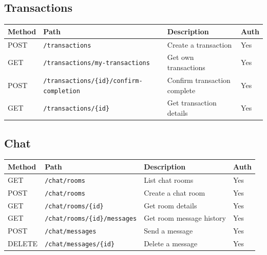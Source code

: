 \documentclass[11pt,a4paper]{report}
\begin{document}
\subsection{Transactions}

\begin{longtable}{|l|p{6.5cm}|p{5cm}|l|}
    \hline
    \textbf{Method} & \textbf{Path}                                    & \textbf{Description}         & \textbf{Auth} \\
    \hline
    \endhead
    POST            & \texttt{/transactions}                           & Create a transaction         & Yes           \\
    \hline
    GET             & \texttt{/transactions/my-transactions}           & Get own transactions         & Yes           \\
    \hline
    POST            & \texttt{/transactions/\{id\}/confirm-completion} & Confirm transaction complete & Yes           \\
    \hline
    GET             & \texttt{/transactions/\{id\}}                    & Get transaction details      & Yes           \\
    \hline
\end{longtable}

\subsection{Chat}

\begin{longtable}{|l|p{6.5cm}|p{5cm}|l|}
    \hline
    \textbf{Method} & \textbf{Path}                        & \textbf{Description}     & \textbf{Auth} \\
    \hline
    \endhead
    GET             & \texttt{/chat/rooms}                 & List chat rooms          & Yes           \\
    \hline
    POST            & \texttt{/chat/rooms}                 & Create a chat room       & Yes           \\
    \hline
    GET             & \texttt{/chat/rooms/\{id\}}          & Get room details         & Yes           \\
    \hline
    GET             & \texttt{/chat/rooms/\{id\}/messages} & Get room message history & Yes           \\
    \hline
    POST            & \texttt{/chat/messages}              & Send a message           & Yes           \\
    \hline
    DELETE          & \texttt{/chat/messages/\{id\}}       & Delete a message         & Yes           \\
    \hline
\end{longtable}
\end{document}
